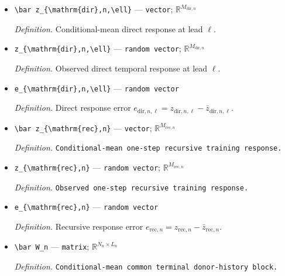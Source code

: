 \documentclass{article}
\begin{document}
\begin{itemize}
  \item \texttt{\textbackslash{}\allowbreak{}bar z\_\allowbreak{}\{\textbackslash{}\allowbreak{}mathrm\{dir\}\allowbreak{},\allowbreak{}n,\allowbreak{}\textbackslash{}\allowbreak{}ell\}\allowbreak{}} --- \texttt{vector}; \(\mathbb R^{M_{\mathrm{dir},n}}\)
  \par\smallskip\noindent\emph{Definition.} Conditional-mean direct response at lead \(\ell\).
  \item \texttt{z\_\allowbreak{}\{\textbackslash{}\allowbreak{}mathrm\{dir\}\allowbreak{},\allowbreak{}n,\allowbreak{}\textbackslash{}\allowbreak{}ell\}\allowbreak{}} --- \texttt{random vector}; \(\mathbb R^{M_{\mathrm{dir},n}}\)
  \par\smallskip\noindent\emph{Definition.} Observed direct temporal response at lead \(\ell\).
  \item \texttt{e\_\allowbreak{}\{\textbackslash{}\allowbreak{}mathrm\{dir\}\allowbreak{},\allowbreak{}n,\allowbreak{}\textbackslash{}\allowbreak{}ell\}\allowbreak{}} --- \texttt{random vector}
  \par\smallskip\noindent\emph{Definition.} Direct response error \(e_{\mathrm{dir},n,\ell}=z_{\mathrm{dir},n,\ell}-\bar z_{\mathrm{dir},n,\ell}\).
  \item \texttt{\textbackslash{}\allowbreak{}bar z\_\allowbreak{}\{\textbackslash{}\allowbreak{}mathrm\{rec\}\allowbreak{},\allowbreak{}n\}\allowbreak{}} --- \texttt{vector}; \(\mathbb R^{M_{\mathrm{rec},n}}\)
  \par\smallskip\noindent\emph{Definition.} \texttt{Conditional-\allowbreak{}mean one-\allowbreak{}step recursive training response.}
  \item \texttt{z\_\allowbreak{}\{\textbackslash{}\allowbreak{}mathrm\{rec\}\allowbreak{},\allowbreak{}n\}\allowbreak{}} --- \texttt{random vector}; \(\mathbb R^{M_{\mathrm{rec},n}}\)
  \par\smallskip\noindent\emph{Definition.} \texttt{Observed one-\allowbreak{}step recursive training response.}
  \item \texttt{e\_\allowbreak{}\{\textbackslash{}\allowbreak{}mathrm\{rec\}\allowbreak{},\allowbreak{}n\}\allowbreak{}} --- \texttt{random vector}
  \par\smallskip\noindent\emph{Definition.} Recursive response error \(e_{\mathrm{rec},n}=z_{\mathrm{rec},n}-\bar z_{\mathrm{rec},n}\).
  \item \texttt{\textbackslash{}\allowbreak{}bar W\_\allowbreak{}n} --- \texttt{matrix}; \(\mathbb R^{N_n\times L_n}\)
  \par\smallskip\noindent\emph{Definition.} \texttt{Conditional-\allowbreak{}mean common terminal donor-\allowbreak{}history block.}

\end{itemize}
\end{document}
